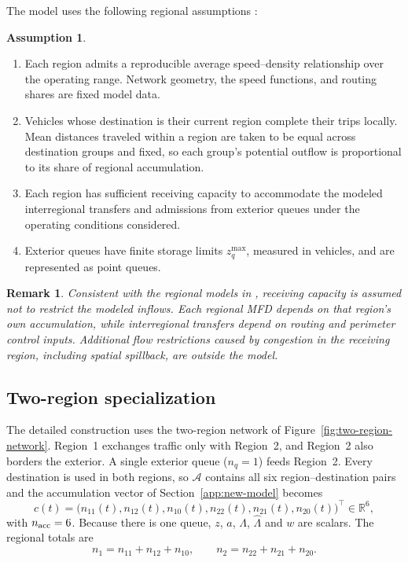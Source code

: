 \documentclass[final]{cas-sc}
\theoremstyle{definition}
\newtheorem{assumption}{Assumption}
\theoremstyle{plain}
\newtheorem{remark}{Remark}
\theoremstyle{definition}
\theoremstyle{plain}
\newcommand{\R}{\mathbb{R}}
\begin{document}
The model uses the following regional assumptions
\cite{geroliminis2011properties,geroliminis2013mpc,mohajerpoor2020hinf}:
\begin{assumption}
\label{ass:regional-model}
\begin{enumerate}
\renewcommand{\labelenumi}{(\alph{enumi})}
\item Each region admits a reproducible average speed--density
relationship over the operating range. Network geometry, the speed
functions, and routing shares are fixed model data.
\item Vehicles whose destination is their current region complete their
trips locally. Mean distances traveled within a region are taken to be
equal across destination groups and fixed, so each group's potential
outflow is proportional to its share of regional accumulation.
\item Each region has sufficient receiving capacity to accommodate
the modeled interregional transfers and admissions from exterior
queues under the operating conditions considered.
\item Exterior queues have finite storage limits $z_q^{\max}$,
measured in vehicles, and are represented as point queues.
\end{enumerate}
\end{assumption}

\begin{remark}
Consistent with the regional models in
\cite{zhong2018robust,mohajerpoor2020hinf}, receiving capacity is
assumed not to restrict the modeled inflows. Each regional MFD
depends on that region's own accumulation, while interregional
transfers depend on routing and perimeter control inputs.
Additional flow restrictions caused by congestion in the receiving
region, including spatial spillback, are outside the model.
\end{remark}

\subsection{Two-region specialization}
\label{sec:two-region-model}

The detailed construction uses the two-region network of
Figure~\ref{fig:two-region-network}. Region~1 exchanges traffic only with
Region~2, and Region~2 also borders the exterior. A single exterior
queue ($n_q=1$) feeds Region~2. Every destination is used in both
regions, so $\mathcal A$ contains all six region--destination pairs and
the accumulation vector of Section~\ref{app:new-model} becomes
\[
c(t)=\big(n_{11}(t),n_{12}(t),n_{10}(t),n_{22}(t),n_{21}(t),n_{20}(t)\big)^\top
\in\R^{6},
\]
with $n_{\rm acc}=6$. Because there is one queue, $z$, $a$, $\Lambda$,
$\widehat\Lambda$ and $w$ are scalars. The regional totals are
\begin{equation}
n_1=n_{11}+n_{12}+n_{10},\qquad n_2=n_{22}+n_{21}+n_{20}.
\label{eq:regional-class-totals}
\end{equation}
\end{document}
